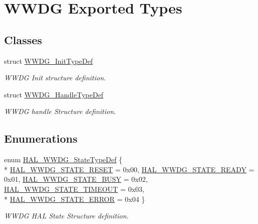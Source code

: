 \hypertarget{group___w_w_d_g___exported___types}{}\section{W\+W\+DG Exported Types}
\label{group___w_w_d_g___exported___types}
\subsection*{Classes}
\begin{DoxyCompactItemize}
\item 
struct \hyperlink{struct_w_w_d_g___init_type_def}{W\+W\+D\+G\+\_\+\+Init\+Type\+Def}
\begin{DoxyCompactList}\small\item\em W\+W\+DG Init structure definition. \end{DoxyCompactList}\item 
struct \hyperlink{struct_w_w_d_g___handle_type_def}{W\+W\+D\+G\+\_\+\+Handle\+Type\+Def}
\begin{DoxyCompactList}\small\item\em W\+W\+DG handle Structure definition. \end{DoxyCompactList}\end{DoxyCompactItemize}
\subsection*{Enumerations}
\begin{DoxyCompactItemize}
\item 
enum \hyperlink{group___w_w_d_g___exported___types_ga0dbbade5e745711745e5f9cc10991301}{H\+A\+L\+\_\+\+W\+W\+D\+G\+\_\+\+State\+Type\+Def} \{ \\*
\hyperlink{group___w_w_d_g___exported___types_gga0dbbade5e745711745e5f9cc10991301ab372108da0acc98eafe256ac1789c6a5}{H\+A\+L\+\_\+\+W\+W\+D\+G\+\_\+\+S\+T\+A\+T\+E\+\_\+\+R\+E\+S\+ET} = 0x00, 
\hyperlink{group___w_w_d_g___exported___types_gga0dbbade5e745711745e5f9cc10991301a4dc3b206181127388e44b6b7838e39fb}{H\+A\+L\+\_\+\+W\+W\+D\+G\+\_\+\+S\+T\+A\+T\+E\+\_\+\+R\+E\+A\+DY} = 0x01, 
\hyperlink{group___w_w_d_g___exported___types_gga0dbbade5e745711745e5f9cc10991301ad0b871d6d748df57f9c354ecf04d9821}{H\+A\+L\+\_\+\+W\+W\+D\+G\+\_\+\+S\+T\+A\+T\+E\+\_\+\+B\+U\+SY} = 0x02, 
\hyperlink{group___w_w_d_g___exported___types_gga0dbbade5e745711745e5f9cc10991301ac35fbcc9e083869cd3410dfff314e985}{H\+A\+L\+\_\+\+W\+W\+D\+G\+\_\+\+S\+T\+A\+T\+E\+\_\+\+T\+I\+M\+E\+O\+UT} = 0x03, 
\\*
\hyperlink{group___w_w_d_g___exported___types_gga0dbbade5e745711745e5f9cc10991301a41c392c0097e126977c5b980c4f2e227}{H\+A\+L\+\_\+\+W\+W\+D\+G\+\_\+\+S\+T\+A\+T\+E\+\_\+\+E\+R\+R\+OR} = 0x04
 \}\begin{DoxyCompactList}\small\item\em W\+W\+DG H\+AL State Structure definition. \end{DoxyCompactList}
\end{DoxyCompactItemize}


